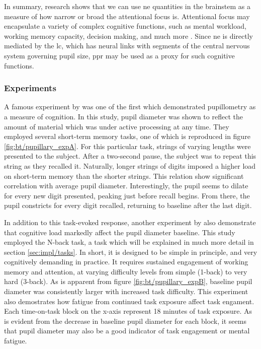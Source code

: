 In summary, research shows that we can use \acrshort{ne} quantities in the brainstem as a measure of how narrow or broad the attentional focus is. Attentional focus may encapsulate a variety of complex cognitive functions, such as mental workload, working memory capacity, decision making, and much more \cite{sara2009}. Since \acrshort{ne} is directly mediated by the \acrfull{lc}, which has neural links with segments of the central nervous system governing pupil size, \acrshort{ppr} may be used as a proxy for such cognitive functions.


\subsubsection{Experiments}

A famous experiment by \textcite{kahneman1966} was one of the first which demonstrated pupillometry as a measure of cognition. In this study, pupil diameter was shown to reflect the amount of material which was under active processing at any time. They employed several short-term memory tasks, one of which is reproduced in figure \ref{fig:bt/pupillary_expA}. For this particular task, strings of varying lengths were presented to the subject. After a two-second pause, the subject was to repeat this string as they recalled it. Naturally, longer strings of digits imposed a higher load on short-term memory than the shorter strings. This relation show significant correlation with average pupil diameter. Interestingly, the pupil seems to dilate for every new digit presented, peaking just before recall begins. From there, the pupil constricts for every digit recalled, returning to baseline after the last digit. 

In addition to this task-evoked response, another experiment by \textcite{hopstaken2015} also demonstrate that cognitive load markedly affect the pupil diameter baseline. This study employed the N-back task, a task which will be explained in much more detail in section \ref{sec:impl/tasks}. In short, it is designed to be simple in principle, and very cognitively demanding in practice. It requires sustained engagement of working memory and attention, at varying difficulty levels from simple (1-back) to very hard (3-back). As is apparent from figure \ref{fig:bt/pupillary_expB}, baseline pupil diameter was consistently larger with increased task difficulty. This experiment also demostrates how fatigue from continued task exposure affect task engament. Each time-on-task block on the x-axis represent 18 minutes of task exposure. As is evident from the decrease in baseline pupil diameter for each block, it seems that pupil diameter may also be a good indicator of task engagement or mental fatigue.

